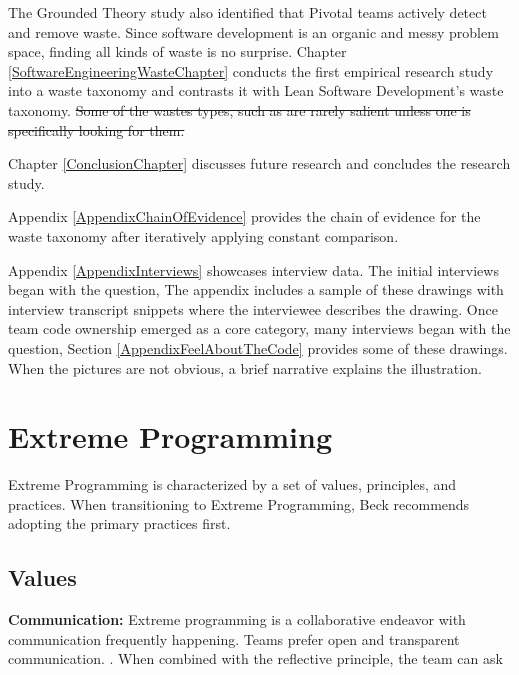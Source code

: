 The Grounded Theory study also identified that Pivotal teams actively detect and remove waste. Since software development is an organic and messy problem space, finding all kinds of waste is no surprise. Chapter \ref{SoftwareEngineeringWasteChapter} conducts the first empirical research study into a waste taxonomy and contrasts it with Lean Software Development's waste taxonomy. \sout{Some of the wastes types, such as  are rarely salient unless one is specifically looking for them.}


Chapter \ref{ConclusionChapter} discusses future research and concludes the research study. 


Appendix \ref{AppendixChainOfEvidence} provides the chain of evidence for the waste taxonomy after iteratively applying constant comparison. 


Appendix \ref{AppendixInterviews} showcases interview data. The initial interviews began with the question,  The appendix includes a sample of these drawings with interview transcript snippets where the interviewee describes the drawing. Once team code ownership emerged as a core category, many interviews began with the question,  Section \ref{AppendixFeelAboutTheCode} provides some of these drawings. When the pictures are not obvious, a brief narrative explains the illustration.




\chapter{Extreme Programming}
Extreme Programming is characterized by a set of values, principles, and practices. When transitioning to Extreme Programming, Beck recommends adopting the primary practices first. 
\section{Values}
\textbf{Communication:} Extreme programming is a collaborative endeavor with communication frequently happening. Teams prefer open and transparent communication. 
 \cite{BeckExtremeProgramming2004}. When combined with the reflective principle, the team can ask  \cite{BeckExtremeProgramming2004}


